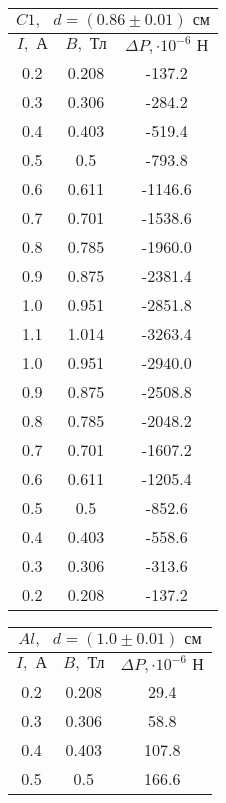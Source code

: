 \documentclass[a4paper,12pt]{article} %
\begin{document}
\begin{table}[h]
        \begin{tabular}{|c|c|c|}
		\hline
            \multicolumn{3}{|c|}{$C1, \text{ } d = (0.86 \pm 0.01) \text{ см}$} \\ \hline
            \hline
		$ I, \text{ А}$ & $ B, \text{ Тл}$ & $\Delta P, \cdot10^{-6}\text{ Н}$ \\ \hline
		0.2 & 0.208 & -137.2 \\ \hline
            0.3 & 0.306 & -284.2 \\ \hline
            0.4 & 0.403 & -519.4 \\ \hline
            0.5 & 0.5 & -793.8 \\ \hline
            0.6 & 0.611 & -1146.6 \\ \hline
            0.7 & 0.701 & -1538.6 \\ \hline
            0.8 & 0.785 & -1960.0 \\ \hline
            0.9 & 0.875 & -2381.4 \\ \hline
            1.0 & 0.951 & -2851.8 \\ \hline
            1.1 & 1.014 & -3263.4 \\ \hline
            1.0 & 0.951 & -2940.0 \\ \hline
            0.9 & 0.875 & -2508.8 \\ \hline
            0.8 & 0.785 & -2048.2 \\ \hline
            0.7 & 0.701 & -1607.2 \\ \hline
            0.6 & 0.611 & -1205.4 \\ \hline
            0.5 & 0.5 & -852.6 \\ \hline
            0.4 & 0.403 & -558.6 \\ \hline
            0.3 & 0.306 & -313.6 \\ \hline
            0.2 & 0.208 & -137.2 \\ \hline
	\end{tabular}
        \begin{tabular}{|c|c|c|}
		\hline
            \multicolumn{3}{|c|}{$Al, \text{ } d = (1.0 \pm 0.01) \text{ см}$} \\ \hline
            \hline
		$ I, \text{ А}$ & $ B, \text{ Тл}$ & $\Delta P, \cdot10^{-6}\text{ Н}$ \\ \hline
		0.2 & 0.208 & 29.4 \\ \hline
            0.3 & 0.306 & 58.8 \\ \hline
            0.4 & 0.403 & 107.8 \\ \hline
            0.5 & 0.5 & 166.6 \\ \hline

\end{tabular}
\end{table}
\end{document}
